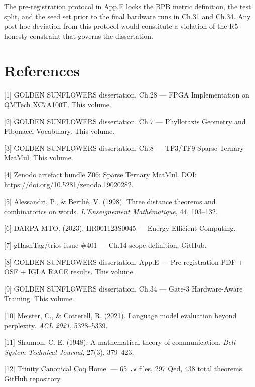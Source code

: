 The pre-registration protocol in App.E locks the
BPB metric definition, the test split, and the
seed set prior to the final hardware runs in Ch.31
and Ch.34. Any post-hoc deviation from this
protocol would constitute a violation of the
R5-honesty constraint that governs the
dissertation.

\section{References}\label{fa_14:references}

[1] GOLDEN SUNFLOWERS dissertation. Ch.28 ---
FPGA Implementation on QMTech XC7A100T. This
volume.

[2] GOLDEN SUNFLOWERS dissertation. Ch.7 ---
Phyllotaxis Geometry and Fibonacci Vocabulary.
This volume.

[3] GOLDEN SUNFLOWERS dissertation. Ch.8 ---
TF3/TF9 Sparse Ternary MatMul. This volume.

[4] Zenodo artefact bundle Z06: Sparse Ternary
MatMul. DOI:
\url{https://doi.org/10.5281/zenodo.19020282}.

[5] Alessandri, P., \& Berthé, V. (1998).
Three distance theorems and combinatorics on
words. \emph{L'Enseignement Mathématique}, 44,
103--132.

[6] DARPA MTO. (2023). HR001123S0045 ---
Energy-Efficient Computing.

[7] gHashTag/trios issue \#401 --- Ch.14 scope
definition. GitHub.

[8] GOLDEN SUNFLOWERS dissertation. App.E ---
Pre-registration PDF + OSF + IGLA RACE results.
This volume.

[9] GOLDEN SUNFLOWERS dissertation. Ch.34 ---
Gate-3 Hardware-Aware Training. This volume.

[10] Meister, C., \& Cotterell, R. (2021).
Language model evaluation beyond perplexity.
\emph{ACL 2021}, 5328--5339.

[11] Shannon, C. E. (1948). A mathematical
theory of communication. \emph{Bell System
Technical Journal}, 27(3), 379--423.

[12] Trinity Canonical Coq Home.
 --- 65
\texttt{.v} files, 297 Qed, 438 total theorems.
GitHub repository.

